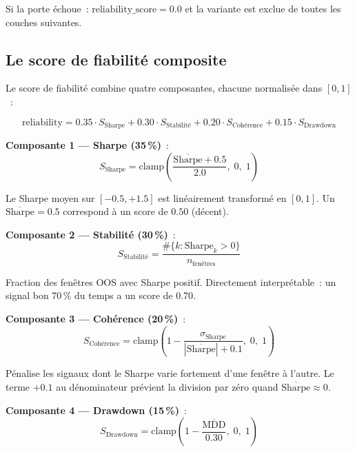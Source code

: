 Si la porte échoue~: $\text{reliability\_score} = 0.0$ et la variante est exclue
de toutes les couches suivantes.

\subsection{Le score de fiabilité composite}

Le score de fiabilité combine quatre composantes, chacune normalisée dans $[0, 1]$~:

\begin{equation}
\text{reliability} = 0.35 \cdot S_{\text{Sharpe}}
                   + 0.30 \cdot S_{\text{Stabilité}}
                   + 0.20 \cdot S_{\text{Cohérence}}
                   + 0.15 \cdot S_{\text{Drawdown}}
\label{eq:reliability}
\end{equation}

\textbf{Composante 1 — Sharpe (35\,\%)}~:
\begin{equation}
S_{\text{Sharpe}} = \text{clamp}\!\left(\frac{\overline{\text{Sharpe}} + 0.5}{2.0},\; 0,\; 1\right)
\label{eq:sharpe_score}
\end{equation}

Le Sharpe moyen sur $[-0.5, +1.5]$ est linéairement transformé en $[0, 1]$.
Un $\overline{\text{Sharpe}} = 0.5$ correspond à un score de $0.50$ (décent).

\textbf{Composante 2 — Stabilité (30\,\%)}~:
\begin{equation}
S_{\text{Stabilité}} = \frac{\#\{k : \text{Sharpe}_k > 0\}}{n_{\text{fenêtres}}}
\label{eq:stability_score}
\end{equation}

Fraction des fenêtres OOS avec Sharpe positif. Directement interprétable~:
un signal \og bon \fg{} 70\,\% du temps a un score de 0.70.

\textbf{Composante 3 — Cohérence (20\,\%)}~:
\begin{equation}
S_{\text{Cohérence}} = \text{clamp}\!\left(1 - \frac{\sigma_{\text{Sharpe}}}{|\overline{\text{Sharpe}}| + 0.1},\; 0,\; 1\right)
\label{eq:consistency_score}
\end{equation}

Pénalise les signaux dont le Sharpe varie fortement d'une fenêtre à l'autre.
Le terme $+0.1$ au dénominateur prévient la division par zéro quand
$\overline{\text{Sharpe}} \approx 0$.

\textbf{Composante 4 — Drawdown (15\,\%)}~:
\begin{equation}
S_{\text{Drawdown}} = \text{clamp}\!\left(1 - \frac{\overline{\text{MDD}}}{0.30},\; 0,\; 1\right)
\label{eq:drawdown_score}
\end{equation}

